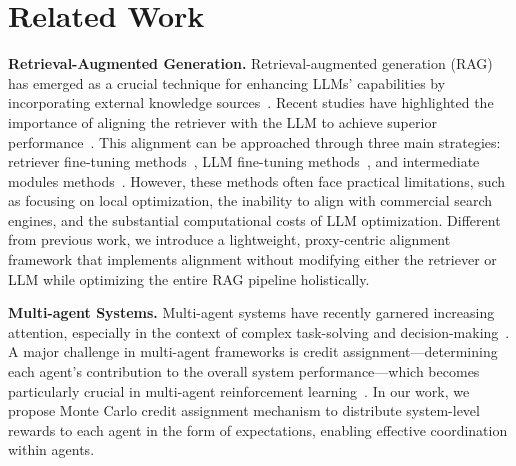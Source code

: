 \section{Related Work}

\textbf{Retrieval-Augmented Generation.}
Retrieval-augmented generation (RAG) has emerged as a crucial technique for enhancing LLMs' capabilities by incorporating external knowledge sources~\citep{abs-2312-10997,abs-2407-02485}.
Recent studies have highlighted the importance of aligning the retriever with the LLM to achieve superior performance~\citep{FanDNWLYCL24,RQ-RAG}.
This alignment can be approached through three main strategies: retriever fine-tuning methods~\citep{ShiMYS0LZY24}, LLM fine-tuning methods~\citep{AsaiWWSH24,abs-2406-13629,auto-rag}, and intermediate modules methods~\citep{MaGHZD23,WangLSL23,TanD0GFW24}.
However, these methods often face practical limitations, such as focusing on local optimization, the inability to align with commercial search engines, and the substantial computational costs of LLM optimization.
Different from previous work, we introduce a lightweight, proxy-centric alignment framework that implements alignment without modifying either the retriever or LLM while optimizing the entire RAG pipeline holistically.

\textbf{Multi-agent Systems.}
Multi-agent systems have recently garnered increasing attention, especially in the context of complex task-solving and decision-making~\citep{GuoCWCPCW024,pmlr-v235-zhang24au}.
A major challenge in multi-agent frameworks is credit assignment—determining each agent's contribution to the overall system performance—which becomes particularly crucial in multi-agent reinforcement learning~\citep{abs-2312-01058,ZhuDW24}.
In our work, we propose Monte Carlo credit assignment mechanism to distribute system-level rewards to each agent in the form of expectations, enabling effective coordination within agents.


